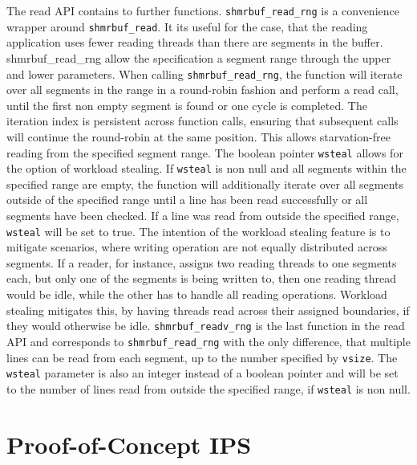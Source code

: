 The read API contains to further functions. \texttt{shmrbuf\_read\_rng} is a convenience wrapper around \texttt{shmrbuf\_read}. It its useful for the case, that the reading
application uses fewer reading threads than there are segments in the buffer. shmrbuf\_read\_rng allow the specification a segment range through the upper
and lower parameters. When calling \texttt{shmrbuf\_read\_rng}, the function will iterate over all segments in the range in a round-robin fashion and perform a read call, until the first non empty segment is found or one cycle is completed.
The iteration index is persistent across function calls, ensuring that subsequent calls will continue the round-robin at the same position. This allows
starvation-free reading from the specified segment range. The boolean pointer \texttt{wsteal} allows for the option of workload stealing.
If \texttt{wsteal} is non null and all segments within the specified range are empty, the function will additionally iterate over all
segments outside of the specified range until a line has been read successfully or all segments have been checked. If a line was read from 
outside the specified range, \texttt{wsteal} will be set to true. The intention of the workload stealing feature is to mitigate scenarios,
where writing operation are not equally distributed across segments. If a reader, for instance, assigns two reading threads to one segments each,
but only one of the segments is being written to, then one reading thread would be idle, while the other has to handle all reading operations.
Workload stealing mitigates this, by having threads read across their assigned boundaries, if they would otherwise be idle.
\texttt{shmrbuf\_readv\_rng} is the last function in the read API and corresponds to \texttt{shmrbuf\_read\_rng} with the only difference,
that multiple lines can be read from each segment, up to the number specified by \texttt{vsize}. The \texttt{wsteal} parameter is
also an integer instead of a boolean pointer and will be set to the number of lines read from outside the specified range, if \texttt{wsteal} is non null.

\section{Proof-of-Concept IPS}

